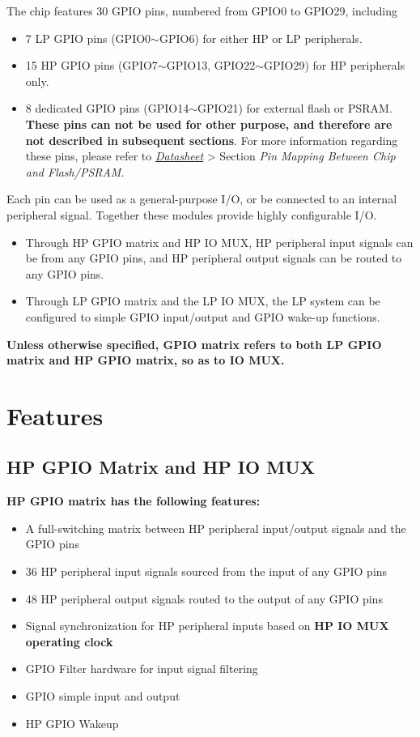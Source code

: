 \documentclass[main\_\_EN.tex]{subfiles}
\begin{document}
The \chipname{} chip features 30 GPIO pins, numbered from GPIO0 to GPIO29, including 
\begin{itemize}
    \item 7 LP GPIO pins (GPIO0$\sim$GPIO6) for either HP or LP peripherals.
    \item 15 HP GPIO pins (GPIO7$\sim$GPIO13, GPIO22$\sim$GPIO29) for HP peripherals only.
    \item 8 dedicated GPIO pins (GPIO14$\sim$GPIO21) for external flash or PSRAM. \textbf{These pins can not be used for other purpose, and therefore are not described in subsequent sections}. For more information regarding these pins, please refer to {\textit{\href{https://www.espressif.com/sites/default/files/documentation/esp32-c61_datasheet_en.pdf}{\chipname{} Datasheet}}} > Section \textit{Pin Mapping Between Chip and Flash/PSRAM}.
\end{itemize}
Each pin can be used as a general-purpose I/O, or be connected to an internal peripheral signal. Together these modules provide highly configurable I/O.
\begin{itemize}
\item Through HP GPIO matrix and HP IO MUX, HP peripheral input signals can be from any GPIO pins, and HP peripheral output signals can be routed to any GPIO pins.
\item Through LP GPIO matrix and the LP IO MUX, the LP system can be configured to simple GPIO input/output and GPIO wake-up functions.
\end{itemize}

\textbf{Unless otherwise specified, GPIO matrix refers to both LP GPIO matrix and HP GPIO matrix, so as to IO MUX.}

\section{Features}
\subsection{HP GPIO Matrix and HP IO MUX}
\textbf{HP GPIO matrix has the following features:}

\begin{itemize}
\item A full-switching matrix between HP peripheral input/output signals and the GPIO pins
\item 36 HP peripheral input signals sourced from the input of any GPIO pins
\item 48 HP peripheral output signals routed to the output of any GPIO pins
\item Signal synchronization for HP peripheral inputs based on \textbf{HP IO MUX operating clock}
\item GPIO Filter hardware for input signal filtering
\item GPIO simple input and output
\item HP GPIO Wakeup
\end{itemize}
\end{document}
